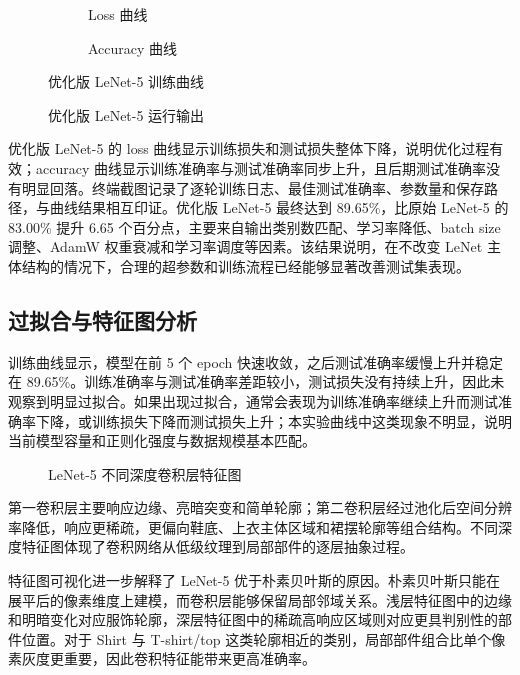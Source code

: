\documentclass[UTF8]{ctexart}
\begin{document}
\begin{figure}[H]
\centering
\begin{subfigure}{0.48\textwidth}
  \centering
  \caption{Loss 曲线}
\end{subfigure}
\begin{subfigure}{0.48\textwidth}
  \centering
  \caption{Accuracy 曲线}
\end{subfigure}
\caption{优化版 LeNet-5 训练曲线}
\end{figure}

\begin{figure}[H]
\centering
{}
\caption{优化版 LeNet-5 运行输出}
\end{figure}

优化版 LeNet-5 的 loss 曲线显示训练损失和测试损失整体下降，说明优化过程有效；accuracy 曲线显示训练准确率与测试准确率同步上升，且后期测试准确率没有明显回落。终端截图记录了逐轮训练日志、最佳测试准确率、参数量和保存路径，与曲线结果相互印证。优化版 LeNet-5 最终达到 89.65\%，比原始 LeNet-5 的 83.00\% 提升 6.65 个百分点，主要来自输出类别数匹配、学习率降低、batch size 调整、AdamW 权重衰减和学习率调度等因素。该结果说明，在不改变 LeNet 主体结构的情况下，合理的超参数和训练流程已经能够显著改善测试集表现。

\subsection{过拟合与特征图分析}

训练曲线显示，模型在前 5 个 epoch 快速收敛，之后测试准确率缓慢上升并稳定在 89.65\%。训练准确率与测试准确率差距较小，测试损失没有持续上升，因此未观察到明显过拟合。如果出现过拟合，通常会表现为训练准确率继续上升而测试准确率下降，或训练损失下降而测试损失上升；本实验曲线中这类现象不明显，说明当前模型容量和正则化强度与数据规模基本匹配。

\begin{figure}[H]
\centering
{}
\caption{LeNet-5 不同深度卷积层特征图}
\end{figure}

第一卷积层主要响应边缘、亮暗突变和简单轮廓；第二卷积层经过池化后空间分辨率降低，响应更稀疏，更偏向鞋底、上衣主体区域和裙摆轮廓等组合结构。不同深度特征图体现了卷积网络从低级纹理到局部部件的逐层抽象过程。

特征图可视化进一步解释了 LeNet-5 优于朴素贝叶斯的原因。朴素贝叶斯只能在展平后的像素维度上建模，而卷积层能够保留局部邻域关系。浅层特征图中的边缘和明暗变化对应服饰轮廓，深层特征图中的稀疏高响应区域则对应更具判别性的部件位置。对于 Shirt 与 T-shirt/top 这类轮廓相近的类别，局部部件组合比单个像素灰度更重要，因此卷积特征能带来更高准确率。
\end{document}
